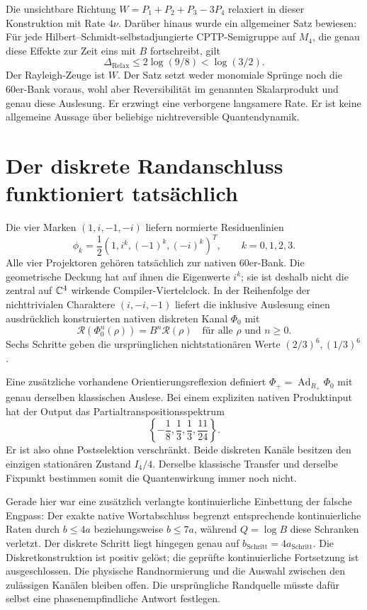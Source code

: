 Die unsichtbare Richtung $W=P_1+P_2+P_3-3P_4$ relaxiert in dieser Konstruktion mit Rate $4\nu$. Darüber hinaus wurde ein allgemeiner Satz bewiesen: Für jede Hilbert--Schmidt-selbstadjungierte CPTP-Semigruppe auf $M_4$, die genau diese Effekte zur Zeit eins mit $B$ fortschreibt, gilt
\[
 \Delta_{\mathrm{Relax}}\le2\log(9/8)<\log(3/2).
\]
Der Rayleigh-Zeuge ist $W$. Der Satz setzt weder monomiale Sprünge noch die 60er-Bank voraus, wohl aber Reversibilität im genannten Skalarprodukt und genau diese Auslesung. Er erzwingt eine verborgene langsamere Rate. Er ist keine allgemeine Aussage über beliebige nichtreversible Quantendynamik. 

\section{Der diskrete Randanschluss funktioniert tatsächlich}
Die vier Marken $(1,i,-1,-i)$ liefern normierte Residuenlinien
\[
 \phi_k=\frac12(1,i^k,(-1)^k,(-i)^k)^T,\qquad k=0,1,2,3.
\]
Alle vier Projektoren gehören tatsächlich zur nativen 60er-Bank. Die geometrische Deckung hat auf ihnen die Eigenwerte $i^k$; sie ist deshalb nicht die zentral auf $\mathbb C^4$ wirkende Compiler-Viertelclock. In der Reihenfolge der nichttrivialen Charaktere $(i,-i,-1)$ liefert die inklusive Auslesung einen ausdrücklich konstruierten nativen diskreten Kanal $\Phi_0$ mit
\[
 \mathcal R(\Phi_0^n(\rho))=B^n\mathcal R(\rho)
 \quad\text{für alle }\rho\text{ und }n\ge0.
\]
Sechs Schritte geben die ursprünglichen nichtstationären Werte $(2/3)^6,(1/3)^6$. 

Eine zusätzliche vorhandene Orientierungsreflexion definiert $\Phi_+=\operatorname{Ad}_{R_+}\Phi_0$ mit genau derselben klassischen Auslese. Bei einem expliziten nativen Produktinput hat der Output das Partialtranspositionsspektrum
\[
 \left\{-\frac18,\frac13,\frac13,\frac{11}{24}\right\}.
\]
Er ist also ohne Postselektion verschränkt. Beide diskreten Kanäle besitzen den einzigen stationären Zustand $I_4/4$. Derselbe klassische Transfer und derselbe Fixpunkt bestimmen somit die Quantenwirkung immer noch nicht. 

Gerade hier war eine zusätzlich verlangte kontinuierliche Einbettung der falsche Engpass: Der exakte native Wortabschluss begrenzt entsprechende kontinuierliche Raten durch $b\le4a$ beziehungsweise $b\le7a$, während $Q=\log B$ diese Schranken verletzt. Der diskrete Schritt liegt hingegen genau auf $b_{\mathrm{Schritt}}=4a_{\mathrm{Schritt}}$. Die Diskretkonstruktion ist positiv gelöst; die geprüfte kontinuierliche Fortsetzung ist ausgeschlossen. Die physische Randnormierung und die Auswahl zwischen den zulässigen Kanälen bleiben offen. Die ursprüngliche Randquelle müsste dafür selbst eine phasenempfindliche Antwort festlegen. 

